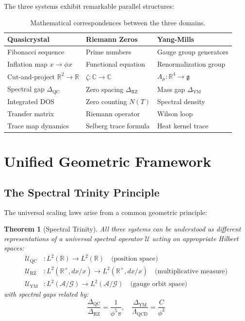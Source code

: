 \documentclass[12pt]{article}
\newtheorem{theorem}{Theorem}[section]
\newcommand{\R}{\mathbb{R}}
\newcommand{\C}{\mathbb{C}}
\newcommand{\QC}{\text{QC}}
\newcommand{\RZ}{\text{RZ}}
\newcommand{\YM}{\text{YM}}
\begin{document}
The three systems exhibit remarkable parallel structures:

\begin{table}[h]
\centering
\renewcommand{\arraystretch}{1.5}
\begin{tabular}{|l|l|l|}
\hline
\textbf{Quasicrystal} & \textbf{Riemann Zeros} & \textbf{Yang-Mills} \\
\hline
Fibonacci sequence & Prime numbers & Gauge group generators \\
\hline
Inflation map $x \to \phi x$ & Functional equation & Renormalization group \\
\hline
Cut-and-project $\R^2 \to \R$ & $\zeta: \C \to \C$ & $A_\mu: \R^4 \to \mathfrak{g}$ \\
\hline
Spectral gap $\Delta_{\QC}$ & Zero spacing $\Delta_{\RZ}$ & Mass gap $\Delta_{\YM}$ \\
\hline
Integrated DOS & Zero counting $N(T)$ & Spectral density \\
\hline
Transfer matrix & Riemann operator & Wilson loop \\
\hline
Trace map dynamics & Selberg trace formula & Heat kernel trace \\
\hline
\end{tabular}
\caption{Mathematical correspondences between the three domains.}
\end{table}

\section{Unified Geometric Framework}

\subsection{The Spectral Trinity Principle}

The universal scaling laws arise from a common geometric principle:

\begin{theorem}[Spectral Trinity]\label{thm:trinity}
All three systems can be understood as different representations of a universal spectral operator $\mathcal{U}$ acting on appropriate Hilbert spaces:
\begin{align}
\mathcal{U}_{\QC} &: L^2(\R) \to L^2(\R) \quad \text{(position space)} \\
\mathcal{U}_{\RZ} &: L^2(\R^+, dx/x) \to L^2(\R^+, dx/x) \quad \text{(multiplicative measure)} \\
\mathcal{U}_{\YM} &: L^2(\mathcal{A}/\mathcal{G}) \to L^2(\mathcal{A}/\mathcal{G}) \quad \text{(gauge orbit space)}
\end{align}
with spectral gaps related by:
\begin{equation}
\boxed{\frac{\Delta_{\QC}}{\Delta_{\RZ}} = \frac{1}{\phi^5\pi}, \quad \frac{\Delta_{\YM}}{\Lambda_{\text{QCD}}} = \frac{C}{\phi^3}}
\end{equation}
\end{theorem}
\end{document}
